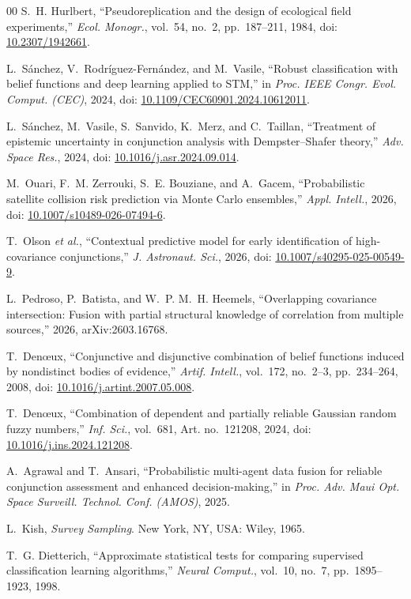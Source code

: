 \documentclass[conference]{IEEEtran}
\begin{document}
\begin{thebibliography}{00}
S.~H. Hurlbert, ``Pseudoreplication and the design of ecological field experiments,'' \emph{Ecol. Monogr.}, vol.~54, no.~2, pp.~187--211, 1984, doi: \url{10.2307/1942661}.

L.~S\'anchez, V.~Rodr\'iguez-Fern\'andez, and M.~Vasile, ``Robust classification with belief functions and deep learning applied to STM,'' in \emph{Proc. IEEE Congr. Evol. Comput. (CEC)}, 2024, doi: \url{10.1109/CEC60901.2024.10612011}.

L.~S\'anchez, M.~Vasile, S.~Sanvido, K.~Merz, and C.~Taillan, ``Treatment of epistemic uncertainty in conjunction analysis with Dempster--Shafer theory,'' \emph{Adv. Space Res.}, 2024, doi: \url{10.1016/j.asr.2024.09.014}.

M.~Ouari, F.~M. Zerrouki, S.~E. Bouziane, and A.~Gacem, ``Probabilistic satellite collision risk prediction via Monte Carlo ensembles,'' \emph{Appl. Intell.}, 2026, doi: \url{10.1007/s10489-026-07494-6}.

T.~Olson \emph{et al.}, ``Contextual predictive model for early identification of high-covariance conjunctions,'' \emph{J. Astronaut. Sci.}, 2026, doi: \url{10.1007/s40295-025-00549-9}.

L.~Pedroso, P.~Batista, and W.~P. M.~H. Heemels, ``Overlapping covariance intersection: Fusion with partial structural knowledge of correlation from multiple sources,'' 2026, arXiv:2603.16768.

T.~Den\oe ux, ``Conjunctive and disjunctive combination of belief functions induced by nondistinct bodies of evidence,'' \emph{Artif. Intell.}, vol.~172, no.~2--3, pp.~234--264, 2008, doi: \url{10.1016/j.artint.2007.05.008}.

T.~Den\oe ux, ``Combination of dependent and partially reliable Gaussian random fuzzy numbers,'' \emph{Inf. Sci.}, vol.~681, Art. no.~121208, 2024, doi: \url{10.1016/j.ins.2024.121208}.

A.~Agrawal and T.~Ansari, ``Probabilistic multi-agent data fusion for reliable conjunction assessment and enhanced decision-making,'' in \emph{Proc. Adv. Maui Opt. Space Surveill. Technol. Conf. (AMOS)}, 2025.

L.~Kish, \emph{Survey Sampling}. New York, NY, USA: Wiley, 1965.

T.~G. Dietterich, ``Approximate statistical tests for comparing supervised classification learning algorithms,'' \emph{Neural Comput.}, vol.~10, no.~7, pp.~1895--1923, 1998.


\end{thebibliography}
\end{document}
